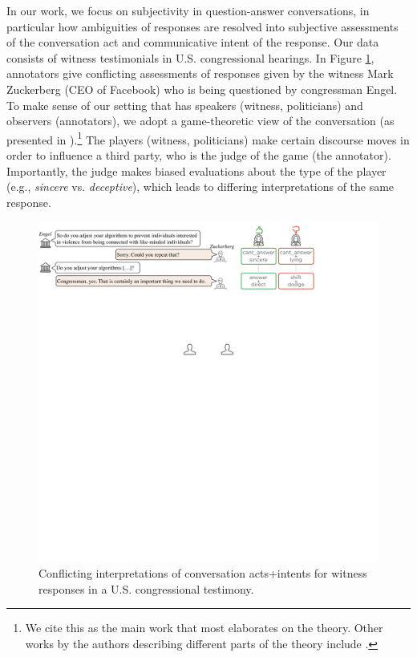 In our work, we focus on subjectivity in question-answer conversations, in particular how  ambiguities of responses are resolved into subjective assessments of the conversation act \cite{Traum:1992} and communicative intent \cite{Cohen:1979} of the response. Our data consists of witness testimonials in U.S. congressional hearings. In Figure \ref{fig:zuckerberg_conversation}, annotators give conflicting assessments of responses given by the witness Mark Zuckerberg (CEO of Facebook) who is being questioned by congressman Engel. To make sense of our setting that has speakers (witness, politicians) and observers (annotators), we adopt a game-theoretic view of the conversation (as presented in ).\footnote{We cite this as the main work that most elaborates on the theory. Other works by the authors describing different parts of the theory include .} The players (witness, politicians) make certain discourse moves in order to influence a third party, who is the judge of the game (the annotator). Importantly, the judge makes biased evaluations about the type of the player (e.g., \emph{sincere} vs. \emph{deceptive}), which leads to differing interpretations of the same response. 
\begin{figure}[t]
\centering
\includegraphics[scale=0.2]{plots/zuckerberg_conversation.pdf}
\vspace{-0.2em}
\caption{Conflicting interpretations of conversation acts+intents for witness responses in a U.S. congressional testimony.}
\label{fig:zuckerberg_conversation}
\vspace{-0.9em}
\end{figure}

